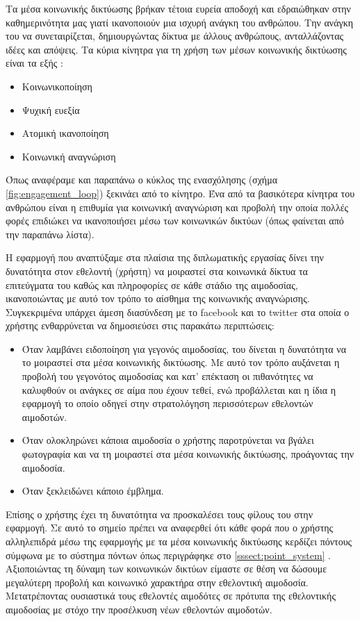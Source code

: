 	Τα μέσα κοινωνικής δικτύωσης βρήκαν τέτοια ευρεία αποδοχή και εδραιώθηκαν στην καθημερινότητα μας γιατί ικανοποιούν μια ισχυρή ανάγκη του ανθρώπου. Την ανάγκη του να συνεταιρίζεται, δημιουργώντας δίκτυα με άλλους ανθρώπους, ανταλλάζοντας ιδέες και απόψεις. Τα κύρια κίνητρα για τη χρήση των μέσων κοινωνικής δικτύωσης είναι τα εξής \cite{Benkler2006}:
	\begin{itemize}
		\item Κοινωνικοποίηση
		\item Ψυχική ευεξία
		\item Ατομική ικανοποίηση
		\item Κοινωνική αναγνώριση
	\end{itemize}		
	
	Όπως αναφέραμε και παραπάνω ο κύκλος της ενασχόλησης (σχήμα \ref{fig:engagement_loop}) ξεκινάει από το κίνητρο. Ένα από τα βασικότερα κίνητρα του ανθρώπου είναι η επιθυμία για κοινωνική αναγνώριση και προβολή \cite{Gamification_on_Participation} την οποία πολλές φορές επιδιώκει να ικανοποιήσει μέσω των κοινωνικών δικτύων (όπως φαίνεται από την παραπάνω λίστα).
	
	Η εφαρμογή που αναπτύξαμε στα πλαίσια της διπλωματικής εργασίας δίνει την δυνατότητα στον εθελοντή (χρήστη) να μοιραστεί στα κοινωνικά δίκτυα τα επιτεύγματα του καθώς και πληροφορίες σε κάθε στάδιο της αιμοδοσίας, ικανοποιώντας με αυτό τον τρόπο το αίσθημα της κοινωνικής αναγνώρισης. Συγκεκριμένα υπάρχει άμεση διασύνδεση με το facebook και το twitter στα οποία ο χρήστης ενθαρρύνεται να δημοσιεύσει στις παρακάτω περιπτώσεις:
	\begin{itemize}
		\item Όταν λαμβάνει ειδοποίηση για γεγονός αιμοδοσίας, του δίνεται η δυνατότητα να το μοιραστεί στα μέσα κοινωνικής δικτύωσης. Με αυτό τον τρόπο αυξάνεται η προβολή του γεγονότος αιμοδοσίας και κατ' επέκταση οι πιθανότητες να καλυφθούν οι ανάγκες σε αίμα που έχουν τεθεί, ενώ προβάλλεται και η ίδια η εφαρμογή το οποίο οδηγεί στην στρατολόγηση περισσότερων εθελοντών αιμοδοτών.
		\item Όταν ολοκληρώνει κάποια αιμοδοσία ο χρήστης παροτρύνεται να βγάλει φωτογραφία και να τη μοιραστεί στα μέσα κοινωνικής δικτύωσης, προάγοντας την αιμοδοσία.
		\item Όταν ξεκλειδώνει κάποιο έμβλημα.
	\end{itemize}
	
	Επίσης ο χρήστης έχει τη δυνατότητα να προσκαλέσει τους φίλους του στην εφαρμογή. Σε αυτό το σημείο πρέπει να αναφερθεί ότι κάθε φορά που ο χρήστης αλληλεπιδρά μέσω της εφαρμογής με τα μέσα κοινωνικής δικτύωσης κερδίζει πόντους σύμφωνα με το σύστημα πόντων όπως περιγράφηκε στο \ref{sssect:point_system} . Αξιοποιώντας τη δύναμη των κοινωνικών δικτύων είμαστε σε θέση να δώσουμε μεγαλύτερη προβολή και κοινωνικό χαρακτήρα στην εθελοντική αιμοδοσία. Μετατρέποντας ουσιαστικά τους εθελοντές αιμοδότες σε πρότυπα της εθελοντικής αιμοδοσίας με στόχο την προσέλκυση νέων εθελοντών αιμοδοτών.
	
